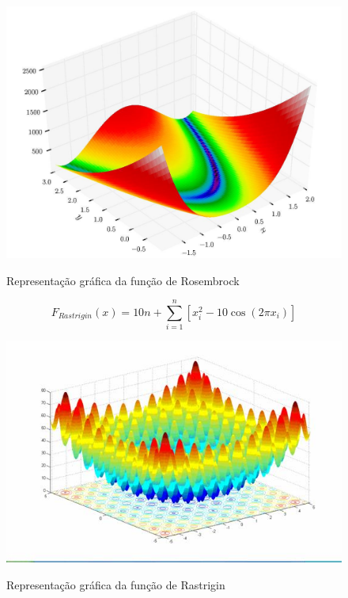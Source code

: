 \begin{figure}[!htb]
	\caption{Representação gráfica da função de Rosembrock}
	\centering
	\includegraphics[scale=0.3]{images/f_rosembrock.jpg}
	\label{fig:f_rosembrock}
\end{figure}

\begin{equation}
\label{eq:rastrigin}
F_{Rastrigin}(x) = 10 n + \sum_{i=1}^{n} \left[ x_i^2 - 10\cos(2\pi x_i)\right]
\end{equation}

\begin{figure}[!htb]
	\caption{Representação gráfica da função de Rastrigin}
	\centering
	\includegraphics[scale=0.5]{images/f_rastrigin.jpg}
	\label{fig:f_rastrigin}
\end{figure}


